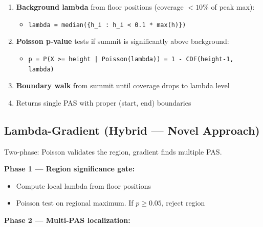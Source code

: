 \documentclass[11pt,a4paper]{article}
\begin{document}
\begin{enumerate}
  \item \textbf{Background lambda} from floor positions (coverage $< 10\%$ of peak max):
        \begin{itemize}
          \item \texttt{lambda = median(\{h\_i : h\_i < 0.1 * max(h)\})}
        \end{itemize}
  \item \textbf{Poisson p-value} tests if summit is significantly above background:
        \begin{itemize}
          \item \texttt{p = P(X >= height | Poisson(lambda)) = 1 - CDF(height-1, lambda)}
        \end{itemize}
  \item \textbf{Boundary walk} from summit until coverage drops to lambda level
  \item Returns single PAS with proper (start, end) boundaries
\end{enumerate}

\subsection{Lambda-Gradient (Hybrid --- Novel Approach)}

Two-phase: Poisson validates the region, gradient finds multiple PAS.

\textbf{Phase 1 --- Region significance gate:}
\begin{itemize}
  \item Compute local lambda from floor positions
  \item Poisson test on regional maximum. If $p \geq 0.05$, reject region
\end{itemize}

\textbf{Phase 2 --- Multi-PAS localization:}
\end{document}
